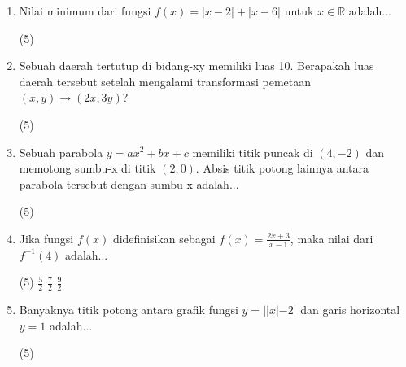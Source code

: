 \documentclass[12pt]{scrartcl}
\begin{document}
\begin{enumerate}
\begin{tasks}[label=\Alph*](5)     

\end{tasks}

\item Nilai minimum dari fungsi $f(x) = |x-2| + |x-6|$ untuk $x \in \mathbb{R}$ adalah...

\begin{tasks}[label=\Alph*](5)     

\end{tasks}

\item Sebuah daerah tertutup di bidang-xy memiliki luas 10. Berapakah luas daerah tersebut setelah mengalami transformasi pemetaan $(x, y) \to (2x, 3y)$?

\begin{tasks}[label=\Alph*](5)     

\end{tasks}

\item Sebuah parabola $y = ax^2 + bx + c$ memiliki titik puncak di $(4, -2)$ dan memotong sumbu-x di titik $(2, 0)$. Absis titik potong lainnya antara parabola tersebut dengan sumbu-x adalah...

\begin{tasks}[label=\Alph*](5)     

\end{tasks}

\item Jika fungsi $f(x)$ didefinisikan sebagai $f(x) = \frac{2x+3}{x-1}$, maka nilai dari $f^{-1}(4)$ adalah...

\begin{tasks}[label=\Alph*](5)  \task $\frac{5}{2}$ \task $\frac{7}{2}$ \task $\frac{9}{2}$ 

\end{tasks}

\item Banyaknya titik potong antara grafik fungsi $y = ||x|-2|$ dan garis horizontal $y = 1$ adalah...

\begin{tasks}[label=\Alph*](5)     

\end{tasks}


\end{enumerate}
\end{document}
